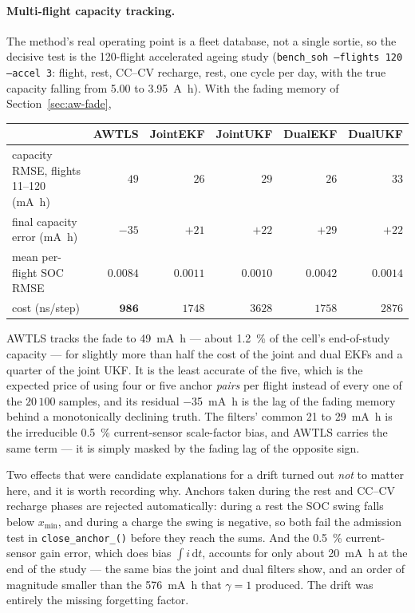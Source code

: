 \paragraph{Multi-flight capacity tracking.}
\label{sec:aw-multi}
The method's real operating point is a fleet database, not a single sortie, so the decisive test is
the 120-flight accelerated ageing study (\texttt{bench\_soh --flights 120 --accel 3}: flight, rest,
CC--CV recharge, rest, one cycle per day, with the true capacity falling from \SI{5.00}{} to
\SI{3.95}{\ampere\hour}).  With the fading memory of Section~\ref{sec:aw-fade},
\begin{center}
\begin{tabular}{@{}lrrrrr@{}}
\toprule
 & AWTLS & JointEKF & JointUKF & DualEKF & DualUKF\\
\midrule
capacity RMSE, flights 11--120 (\si{\milli\ampere\hour}) & $49$ & $26$ & $29$ & $26$ & $33$\\
final capacity error (\si{\milli\ampere\hour})           & $-35$ & $+21$ & $+22$ & $+29$ & $+22$\\
mean per-flight SOC RMSE                                 & $0.0084$ & $0.0011$ & $0.0010$ & $0.0042$ & $0.0014$\\
cost (\si{\nano\second}/step)                            & $\mathbf{986}$ & $1748$ & $3628$ & $1758$ & $2876$\\
\bottomrule
\end{tabular}
\end{center}
AWTLS tracks the fade to \SI{49}{\milli\ampere\hour} --- about \SI{1.2}{\percent} of the cell's
end-of-study capacity --- for slightly more than half the cost of the joint and dual EKFs and
a quarter of the joint UKF.  It is the least
accurate of the five, which is the expected price of using four or five anchor \emph{pairs} per
flight instead of every one of the $20\,100$ samples, and its residual \SI{-35}{\milli\ampere\hour}
is the lag of the fading memory behind a monotonically declining truth.  The filters' common
\SI{+21}{} to \SI{+29}{\milli\ampere\hour} is the irreducible \SI{+0.5}{\percent} current-sensor
scale-factor bias, and AWTLS carries the same term --- it is simply masked by the fading lag of the
opposite sign.

Two effects that were candidate explanations for a drift turned out \emph{not} to matter here, and
it is worth recording why.  Anchors taken during the rest and CC--CV recharge phases are rejected
automatically: during a rest the SOC swing falls below $x_{\min}$, and during a charge the swing is
negative, so both fail the admission test in \texttt{close\_anchor\_()} before they reach the sums.
And the \SI{+0.5}{\percent} current-sensor gain error, which does bias $\int i\,\mathrm{d}t$, accounts
for only about \SI{20}{\milli\ampere\hour} at the end of the study --- the same bias the joint and
dual filters show, and an order of magnitude smaller than the \SI{+576}{\milli\ampere\hour} that
$\gamma=1$ produced.  The drift was entirely the missing forgetting factor.

